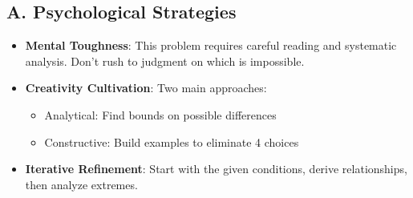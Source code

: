 \documentclass[12pt]{article}
\begin{document}
\begin{strategicbox}
\subsection*{A. Psychological Strategies}
\begin{itemize}[leftmargin=*]
    \item \textbf{Mental Toughness}: This problem requires careful reading and systematic analysis. Don't rush to judgment on which is impossible.
    \item \textbf{Creativity Cultivation}: Two main approaches:
    \begin{itemize}
        \item Analytical: Find bounds on possible differences
        \item Constructive: Build examples to eliminate 4 choices
    \end{itemize}
    \item \textbf{Iterative Refinement}: Start with the given conditions, derive relationships, then analyze extremes.
\end{itemize}


\end{strategicbox}
\end{document}
